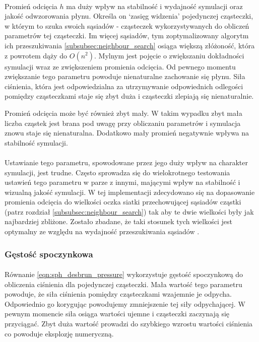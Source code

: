 \paragraph{}
Promień odcięcia $h$ ma duży wpływ na stabilność i wydajność symulacji oraz jakość odwzorowania płynu. Określa on `zasięg widzenia' pojedynczej cząsteczki, w którym to szuka swoich sąsiadów - cząsteczek wykorzystywanych do obliczeń parametrów tej cząsteczki. Im więcej sąsiadów, tym zoptymalizowany algorytm ich przeszukiwania \eqref{subsubsec:neighbour_search} osiąga większą złóżoność, która z powrotem dąży do $O(n^2)$. Mylnym jest pojęcie o zwiększaniu dokładności symulacji wraz ze zwiększeniem promienia odcięcia. Od pewnego momentu zwiększanie tego parametru powoduje nienaturalne zachowanie się płynu. Siła ciśnienia, która jest odpowiedzialna za utrzymywanie odpowiednich odlegości pomiędzy cząsteczkami staje się zbyt duża i cząsteczki zlepiają się nienaturalnie.
\par
Promień odcięcia może być również zbyt mały. W takim wypadku zbyt mała liczba cząstek jest brana pod uwagę przy obliczaniu parametrów i symulacja znowu staje się nienaturalna. Dodatkowo mały promień negatywnie wpływa na stabilność symulacji.
\par
\paragraph{}
Ustawianie tego parametru, spowodowane przez jego duży wpływ na charakter symulacji, jest trudne. Często sprowadza się do wielokrotnego testowania ustawień tego parametru w parze z innymi, mającymi wpływ na stabilność i wizualną jakość symulacji. W tej implementacji zdecydowano się na dopasowanie promienia odcięcia do wielkości oczka siatki przechowującej sąsiadów cząstki (patrz rozdział \eqref{subsubsec:neighbour_search}) tak aby te dwie wielkości były jak najbardziej zbliżone. Zostało zbadane, że taki stosunek tych wielkości jest optymalny ze względu na wydajność przeszukiwania sąsiadów \cite{teschner14}.
\par

\subsubsection{Gęstość spoczynkowa}

\paragraph{}
Równanie \eqref{eqn:sph_desbrun_pressure} wykorzystuje gęstość spoczynkową do obliczenia ciśnienia dla pojedynczej cząsteczki. Mała wartość tego parametru powoduje, że siła ciśnienia pomiędzy cząsteczkami wzajemnie je odpycha. Odpowiednio go korygując powodujemy zmniejszenie tej siły odpychającej. W pewnym momencie siła osiąga wartości ujemne i cząsteczki zaczynają się przyciągać. Zbyt duża wartość prowadzi do szybkiego wzrostu wartości ciśnienia co powoduje eksplozję numeryczną.
\par

